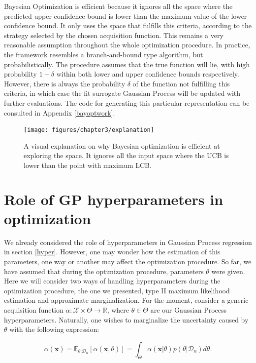 \documentclass[10pt,a4paper,twoside]{book}
\begin{document}
Bayesian Optimization is efficient because it ignores all the space where the predicted upper confidence bound is lower than the maximum value of the lower confidence bound. It only uses the space that fulfills this criteria, according to the strategy selected by the chosen acquisition function. This remains a very reasonable assumption throughout the whole optimization procedure. In practice, the framework resembles a branch-and-bound type algorithm, but probabilistically.  The procedure assumes that the true function will lie, with high probability $1-\delta$ within both lower and upper confidence bounds respectively. However, there is always the probability $\delta$ of the function not fulfilling this criteria, in which case the fit surrogate Gaussian Process will be updated with further evaluations. The code for generating this particular representation can be consulted in Appendix \ref{bayoptwork}.

\begin{figure}
	\caption{A visual explanation on why Bayesian optimization is efficient at exploring the space. It ignores all the input space where the UCB is lower than the point with maximum LCB.}
	\label{fig:explanation}
	\texttt{[image: figures/chapter3/explanation]}
\end{figure}


\section{Role of GP hyperparameters in optimization}

We already considered the role of hyperparameters in Gaussian Process regression in section \ref{hyper}. However, one may wonder how the estimation of this parameters, one way or another may affect the optimization procedure. So far, we have assumed that during the optimization procedure, parameters $\theta$ were given. Here we will consider two ways of handling hyperparameters during the optimization procedure, the one we presented, type II maximum likelihood estimation and approximate marginalization. For the moment, consider a generic acquisition function $\alpha:\mathcal{X} \times \Theta \rightarrow \mathbb{R}$, where $\theta \in \Theta$ are our Gaussian Process hyperparameters. Naturally, one wishes to marginalize the uncertainty caused by $\theta$ with the following expression:

\begin{equation}
\alpha(\boldsymbol{x}) = \mathbb{E}_{\theta|\mathcal{D}_n}\left[ \alpha(\boldsymbol{x}, \theta) \right] = \int_{\Theta} \alpha(\boldsymbol{x}|\theta)p(\theta|\mathcal{D}_n)d\theta.
\end{equation}
\end{document}

